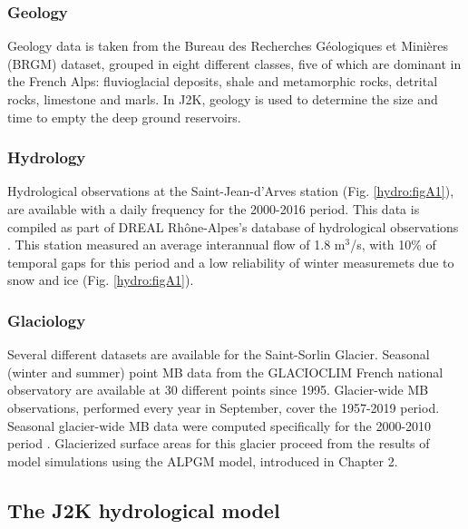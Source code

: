 \subsubsection{Geology}

Geology data is taken from the Bureau des Recherches Géologiques et Minières (BRGM) dataset, grouped in eight different classes, five of which are dominant in the French Alps: fluvioglacial deposits, shale and metamorphic rocks, detrital rocks, limestone and marls. In J2K, geology is used to determine the size and time to empty the deep ground reservoirs. 

\subsubsection{Hydrology}

Hydrological observations at the Saint-Jean-d'Arves station (Fig. \ref{hydro:figA1}), are available with a daily frequency for the 2000-2016 period. This data is compiled as part of DREAL Rhône-Alpes's database of hydrological observations \citep{brigode_summary_2020}. This station measured an average interannual flow of 1.8 m$^{3}$/s, with 10\% of temporal gaps for this period and a low reliability of winter measuremets due to snow and ice (Fig. \ref{hydro:figA1}).

\subsubsection{Glaciology}

Several different datasets are available for the Saint-Sorlin Glacier. Seasonal (winter and summer) point MB data from the GLACIOCLIM French national observatory are available at 30 different points since 1995. Glacier-wide MB observations, performed every year in September, cover the 1957-2019 period. Seasonal glacier-wide MB data were computed specifically for the 2000-2010 period \citep{davaze_monitoring_2018}. Glacierized surface areas for this glacier proceed from the results of model simulations using the ALPGM model, introduced in Chapter 2. 

\subsection{The J2K hydrological model}

